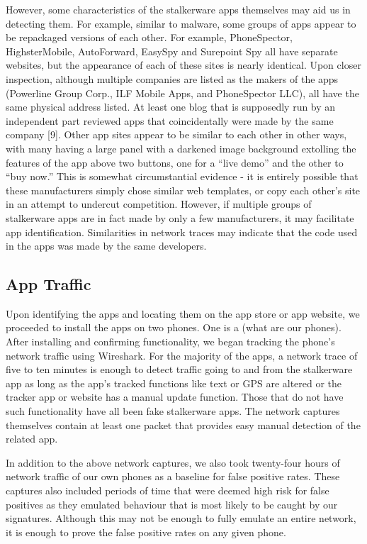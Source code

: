 \documentclass[acmtog]{acmart}
\begin{document}
However, some characteristics of the stalkerware apps themselves may aid us in 
detecting them. For example, similar to malware, some groups of apps appear to 
be repackaged versions of each other. For example, PhoneSpector, 
HighsterMobile, AutoForward, EasySpy and Surepoint Spy all have separate 
websites, but the appearance of each of these sites is nearly identical. Upon 
closer inspection, although multiple companies are listed as the makers of the 
apps (Powerline Group Corp., ILF Mobile Apps, and PhoneSpector LLC), all have 
the same physical address listed. At least one blog that is supposedly run by 
an independent part reviewed apps that coincidentally were made by the same 
company [9]. Other app sites appear to be similar to each other in other ways, 
with many having a large panel with a darkened image background extolling the 
features of the app above two buttons, one for a “live demo” and the other to 
“buy now.” This is somewhat circumstantial evidence - it is entirely possible 
that these manufacturers simply chose similar web templates, or copy each 
other’s site in an attempt to undercut competition. However, if multiple groups 
of stalkerware apps are in fact made by only a few manufacturers, it may 
facilitate app identification. Similarities in network traces may indicate that 
the code used in the apps was made by the same developers.

\subsection{App Traffic}

Upon identifying the apps and locating them on the app store or app website, we 
proceeded to install the apps on two phones. One is a (what are our phones). 
After installing and confirming functionality, we began tracking the phone's 
network traffic using Wireshark. For the majority of the apps, a network trace 
of five to ten minutes is enough to detect traffic going to and from the 
stalkerware app as long as the app's tracked functions like text or GPS are 
altered or the tracker app or website has a manual update function. Those that 
do not have such functionality have all been fake stalkerware apps. The network 
captures themselves contain at least one packet that provides easy manual 
detection of the related app.

In addition to the above network captures, we also took twenty-four hours of 
network traffic of our own phones as a baseline for false positive rates. These 
captures also included periods of time that were deemed high risk for false 
positives as they emulated behaviour that is most likely to be caught by our 
signatures. Although this may not be enough to fully emulate an entire network, 
it is enough to prove the false positive rates on any given phone.
\end{document}
